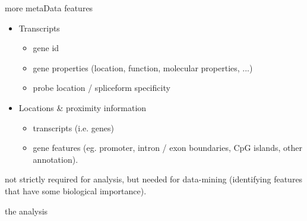 \documentclass[pdf]{beamer}
\begin{document}
\begin{frame}{more metaData}
  features
  \begin{itemize}
  \item Transcripts
    \begin{itemize}
    \item gene id
    \item gene properties (location, function, molecular properties, ...)
    \item probe location / spliceform specificity
    \end{itemize}
  \item Locations \& proximity information
    \begin{itemize}
    \item transcripts (i.e. genes)
    \item gene features (eg. promoter, intron / exon boundaries, 
      CpG islands, other annotation).
    \end{itemize}
  \end{itemize}
  not strictly required for analysis, but needed for data-mining
  (identifying features that have some biological importance).
\end{frame}

\begin{frame}{the analysis}
  \begin{figure}[ht]
  \end{figure}
\end{frame}
\end{document}
